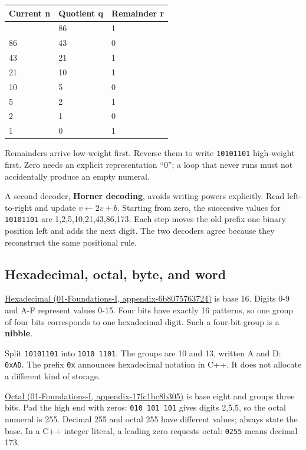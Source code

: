 {\def\LTcaptype{none} %
\begin{longtable}[]{@{}lll@{}}
\toprule\noalign{}
Current n & Quotient q & Remainder r \\
\midrule\noalign{}
\endhead
\bottomrule\noalign{}
\endlastfoot
173 & 86 & 1 \\
86 & 43 & 0 \\
43 & 21 & 1 \\
21 & 10 & 1 \\
10 & 5 & 0 \\
5 & 2 & 1 \\
2 & 1 & 0 \\
1 & 0 & 1 \\
\end{longtable}
}

Remainders arrive low-weight first. Reverse them to write \texttt{10101101} high-weight first. Zero needs an explicit representation ``0''; a loop that never runs must not accidentally produce an empty numeral.

A second decoder, \textbf{Horner decoding}, avoids writing powers explicitly. Read left-to-right and update \(v\leftarrow2v+b\). Starting from zero, the successive values for \texttt{10101101} are 1,2,5,10,21,43,86,173. Each step moves the old prefix one binary position left and adds the next digit. The two decoders agree because they reconstruct the same positional rule.

\subsection{Hexadecimal, octal, byte, and word}\label{05-engine-i-ch001-hexadecimal-octal-byte-and-word}

\href{../01-Foundations-I/main.pdf\#nameddest=appendix-6b8075763724}{Hexadecimal (01-Foundations-I, appendix-6b8075763724)} is base 16. Digits 0-9 and A-F represent values 0-15. Four bits have exactly 16 patterns, so one group of four bits corresponds to one hexadecimal digit. Such a four-bit group is a \textbf{nibble}.

Split \texttt{10101101} into \texttt{1010\ 1101}. The groups are 10 and 13, written A and D: \texttt{0xAD}. The prefix \texttt{0x} announces hexadecimal notation in C++. It does not allocate a different kind of storage.

\href{../01-Foundations-I/main.pdf\#nameddest=appendix-17fc1bc8b305}{Octal (01-Foundations-I, appendix-17fc1bc8b305)} is base eight and groups three bits. Pad the high end with zeros: \texttt{010\ 101\ 101} gives digits 2,5,5, so the octal numeral is 255. Decimal 255 and octal 255 have different values; always state the base. In a C++ integer literal, a leading zero requests octal: \texttt{0255} means decimal 173.

